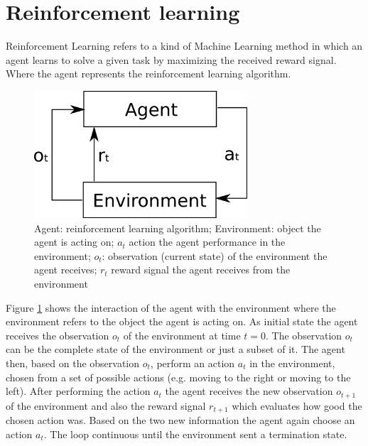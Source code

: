 \section{Reinforcement learning}

Reinforcement Learning refers to a kind of Machine Learning method in which an agent learns to solve a given task by maximizing the received reward signal. Where the agent represents the reinforcement learning algorithm.\\


\begin{figure}[H]
  \centering
  \includegraphics[width=300px]{Images/rl_agent.png} 
  \caption{Agent: reinforcement learning algorithm; Environment: object the agent is acting on; $a_t$ action the agent performance in the environment; $o_t$: observation (current state) of the environment the agent receives; $r_t$ reward signal the agent receives from the environment}
  \label{fig:reinforcement_learning}
\end{figure}


Figure \ref{fig:reinforcement_learning} shows the interaction of the agent with the environment where the environment refers to the object the agent is acting on. As initial state the agent receives the observation $o_t$ of the environment at time $t = 0$. The observation $o_t$ can be the complete state of the environment or just a subset of it.
The agent then, based on the observation $o_t$, perform an action $a_t$ in the environment, chosen from a set of possible actions (e.g. moving to the right or moving to the left). After performing the action $a_t$ the agent receives the new observation $o_{t+1}$ of the environment and also the reward signal $r_{t+1}$ which evaluates how good the chosen action was.
Based on the two new information the agent again choose an action $a_t$. The loop continuous until the environment sent a termination state.\\

